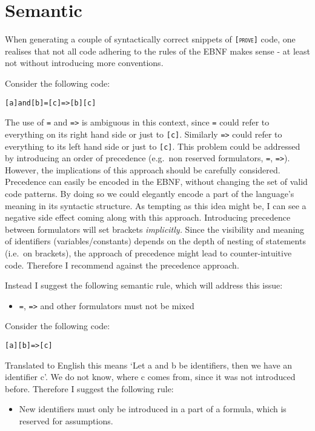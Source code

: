 \documentclass[british]{article}
\newcommand\prv{bc}
\newcommand\m[1]{\texttt{#1}}
\begin{document}
\section{Semantic}

When generating a couple of syntactically correct snippets of \texttt{\textsc{{[}prove{]}}}
code, one realises that not all code adhering to the rules of the
EBNF makes sense - at least not without introducing more conventions.

\medskip{}

Consider the following code:

\begin{verbatim}
[a]and[b]=[c]=>[b][c]
\end{verbatim}

The use of \m{=} and \m{=>} is ambiguous in this context, since
\m{=} could refer to everything on its right hand side or just to
\m{[c]}. Similarly \m{=>} could refer to everything to its left
hand side or just to \m{[c]}. This problem could be addressed by
introducing an order of precedence (e.g.\ non reserved formulators,
\m{=}, \m{=>}). However, the implications of this approach should
be carefully considered. Precedence can easily be encoded in the EBNF,
without changing the set of valid code patterns. By doing so we could
elegantly encode a part of the language's meaning in its syntactic
structure. As tempting as this idea might be, I can see a negative
side effect coming along with this approach. Introducing precedence
between formulators will set brackets \textit{implicitly. }Since the
visibility and meaning of identifiers (variables/constants) depends
on the depth of nesting of statements (i.e.\ on brackets), the approach
of precedence might lead to counter-intuitive code. Therefore I recommend
against the precedence approach.

\pagebreak{}

Instead I suggest the following semantic rule, which will address
this issue:
\begin{itemize}
\item \m{=}, \m{=>} and other formulators must not be mixed
\end{itemize}
\medskip{}

Consider the following code:

\begin{verbatim}
[a][b]=>[c]
\end{verbatim}

Translated to English this means `Let a and b be identifiers, then
we have an identifier c'. We do not know, where c comes from, since
it was not introduced before. Therefore I suggest the following rule:
\begin{itemize}
\item New identifiers must only be introduced in a part of a formula, which
is reserved for assumptions.
\end{itemize}
\medskip{}
\end{document}
